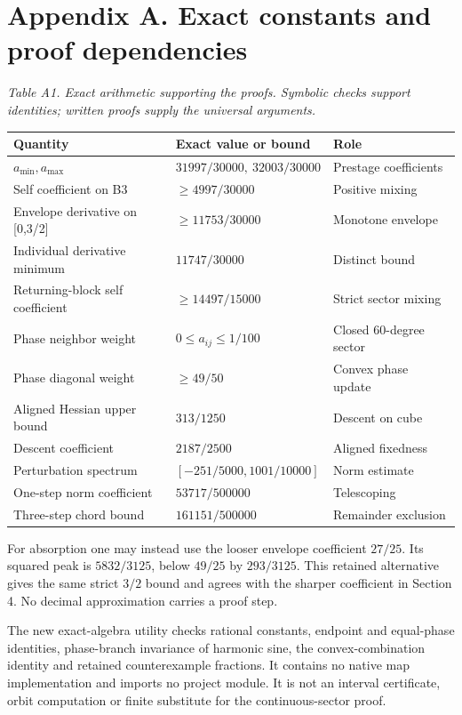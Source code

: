 \documentclass[11pt,a4paper]{article}
\begin{document}
\clearpage
\section*{Appendix A. Exact constants and proof dependencies}
\par\textit{Table A1. Exact arithmetic supporting the proofs. Symbolic checks support identities; written proofs supply the universal arguments.}
\begingroup\small
\begin{tabularx}{\textwidth}{XXX}
\toprule
Quantity & Exact value or bound & Role\\\midrule
$a_{\min},a_{\max}$ & $31997/30000,\ 32003/30000$ & Prestage coefficients\\
Self coefficient on B3 & $\geq4997/30000$ & Positive mixing\\
Envelope derivative on [0,3/2] & $\geq11753/30000$ & Monotone envelope\\
Individual derivative minimum & $11747/30000$ & Distinct bound\\
Returning-block self coefficient & $\geq14497/15000$ & Strict sector mixing\\
Phase neighbor weight & $0\leq a_{ij}\leq1/100$ & Closed 60-degree sector\\
Phase diagonal weight & $\geq49/50$ & Convex phase update\\
Aligned Hessian upper bound & $313/1250$ & Descent on cube\\
Descent coefficient & $2187/2500$ & Aligned fixedness\\
Perturbation spectrum & $[-251/5000,1001/10000]$ & Norm estimate\\
One-step norm coefficient & $53717/500000$ & Telescoping\\
Three-step chord bound & $161151/500000$ & Remainder exclusion\\
\bottomrule\end{tabularx}\endgroup\par
For absorption one may instead use the looser envelope coefficient $27/25$. Its squared peak is $5832/3125$, below $49/25$ by $293/3125$. This retained alternative gives the same strict $3/2$ bound and agrees with the sharper coefficient in Section 4. No decimal approximation carries a proof step.

The new exact-algebra utility checks rational constants, endpoint and equal-phase identities, phase-branch invariance of harmonic sine, the convex-combination identity and retained counterexample fractions. It contains no native map implementation and imports no project module. It is not an interval certificate, orbit computation or finite substitute for the continuous-sector proof.
\end{document}
